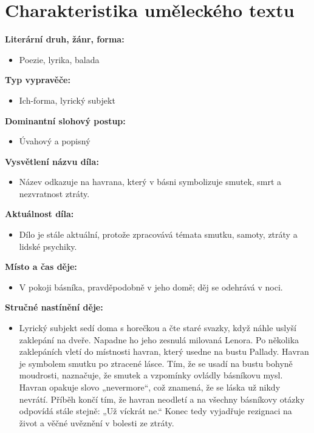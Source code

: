 \documentclass[12pt,a4paper]{article}
\begin{document}
\section*{Charakteristika uměleckého textu}

\begin{tcolorbox}[breakable]

\textbf{Literární druh, žánr, forma:}
\begin{itemize}
\item Poezie, lyrika, balada
\end{itemize}

\textbf{Typ vypravěče:}
\begin{itemize}
\item Ich-forma, lyrický subjekt
\end{itemize}

\textbf{Dominantní slohový postup:}
\begin{itemize}
\item Úvahový a popisný
\end{itemize}

\textbf{Vysvětlení názvu díla:}
\begin{itemize}
\item Název odkazuje na havrana, který v básni symbolizuje smutek, smrt a nezvratnost ztráty.
\end{itemize}

\textbf{Aktuálnost díla:}
\begin{itemize}
\item Dílo je stále aktuální, protože zpracovává témata smutku, samoty, ztráty a lidské psychiky.
\end{itemize}

\textbf{Místo a čas děje:}
\begin{itemize}
\item V pokoji básníka, pravděpodobně v jeho domě; děj se odehrává v noci.
\end{itemize}

\textbf{Stručné nastínění děje:}
\begin{itemize}
\item Lyrický subjekt sedí doma s horečkou a čte staré svazky, když náhle uslyší zaklepání na dveře. Napadne ho jeho zesnulá milovaná Lenora. Po několika zaklepáních vletí do místnosti havran, který usedne na bustu Pallady. Havran je symbolem smutku po ztracené lásce. Tím, že se usadí na bustu bohyně moudrosti, naznačuje, že smutek a vzpomínky ovládly básníkovu mysl. Havran opakuje slovo „nevermore“, což znamená, že se láska už nikdy nevrátí. Příběh končí tím, že havran neodletí a na všechny básníkovy otázky odpovídá stále stejně: „Už víckrát ne.“ Konec tedy vyjadřuje rezignaci na život a věčné uvěznění v bolesti ze ztráty.
\end{itemize}


\end{tcolorbox}
\end{document}
